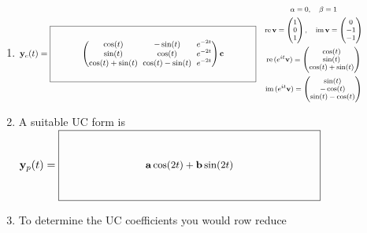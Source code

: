 \documentclass[12pt,letterpaper]{article}
\newcommand{\KeyBox}[3]{%
  \vcenter{\hbox{$\boxed{\parbox[c][#2][c]{#1}{\centering\small
    \setlength{\arraycolsep}{3pt}\renewcommand{\arraystretch}{0.95}%
    \ensuremath{\displaystyle #3}}}$}}}
\newcommand{\KeySide}[2]{\quad\vcenter{\hbox{\parbox{#1}{\footnotesize\setlength{\arraycolsep}{2pt}\ensuremath{\begin{gathered}#2\end{gathered}}}}}}
\begin{document}
\begin{enumerate}
\begin{enumerate}
\item 
$\vect{y}_c(t)=\KeyBox{3.2in}{0.80in}{\begin{pmatrix}\cos(t)&-\sin(t)&e^{-2t}\\\sin(t)&\cos(t)&e^{-2t}\\\cos(t)+\sin(t)&\cos(t)-\sin(t)&e^{-2t}\end{pmatrix}\vect{c}}\KeySide{2.4in}{\alpha=0,\quad\beta=1\\ \mathrm{re}\,\vect{v}=\begin{pmatrix}1\\0\\1\end{pmatrix},\quad\mathrm{im}\,\vect{v}=\begin{pmatrix}0\\-1\\-1\end{pmatrix}\\\mathrm{re}\,(e^{it}\vect{v})=\begin{pmatrix}\cos(t)\\\sin(t)\\\cos(t)+\sin(t)\end{pmatrix}\\\mathrm{im}\,(e^{it}\vect{v})=\begin{pmatrix}\sin(t)\\-\cos(t)\\\sin(t)-\cos(t)\end{pmatrix}}$
\item A suitable UC form is
\newline
$\vect{y}_p(t)=\KeyBox{3.2in}{0.80in}{\vect{a}\cos(2t)+\vect{b}\sin(2t)}$
\item To determine the UC coefficients 
you would row reduce \newline


\end{enumerate}
\end{enumerate}
\end{document}
